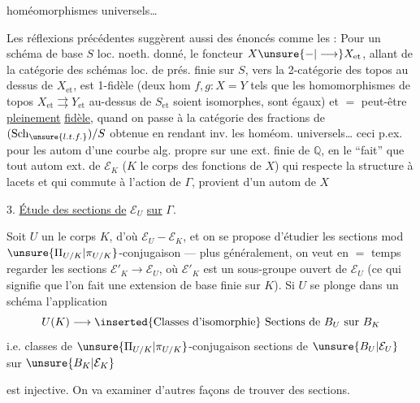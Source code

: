homéomorphismes universels\ldots

Les réflexions précédentes suggèrent aussi des énoncés comme les  : Pour un schéma de base $S$ loc. noeth. donné,
le foncteur $X\unsure{-|\longrightarrow}X_{\mathrm{et}}$, allant de la catégorie des schémas loc. de prés. finie  sur $S$, vers la 2-catégorie des topos au dessus de $X_{\mathrm{et}}$, est  1-fidèle (deux hom $f,g:X=Y$ tels que les homomorphismes de topos  $X_{\mathrm{et}}\rightrightarrows Y_{\mathrm{et}}$ au-dessus de $S_{\mathrm{et}}$ soient  isomorphes, sont égaux) et $=$ peut-être \uline{pleinement} \uline{fidèle}, quand on passe à la catégorie des fractions de $(\mathrm{Sch}_{\unsure{l.t.f.}})/S$ obtenue en rendant inv. les homéom. universels\ldots {}  ceci p.ex. pour les autom d'une courbe alg. propre sur une ext. finie de $\mathbb{Q}$, en  le ``fait'' que tout autom ext. de $\mathcal E_K$ ($K$ le corps des fonctions de $X$) qui respecte la structure à lacets et qui commute à l'action de $\Gamma$, provient d'un autom de $X$

3. \uline{Étude des sections de} $\mathcal{E}_U$ \uline{sur} $\Gamma$.

Soit $U$ un   le corps $K$, d'où $\mathcal{E}_U-\mathcal{E}_K$, et on se propose d'étudier les sections mod $\unsure{\Pi_{U/K}|\pi_{U/K}}$-conjugaison --- plus généralement, on veut en $=$ temps regarder les sections $\mathcal{E}'_K\longrightarrow\mathcal{E}_U$, où $\mathcal{E}'_K$ est un sous-groupe ouvert de $\mathcal{E}_U$ (ce qui signifie que l'on fait une extension de base finie sur $K$). Si  $U$ se plonge dans un schéma   l'application
\[
U(K)\longrightarrow \inserted{\text{Classes d'isomorphie}}\ \text{Sections de }B_U\text{ sur }B_K
\]
i.e. classes de $\unsure{\Pi_{U/K}|\pi_{U/K}}$-conjugaison  sections de $\unsure{B_U|\mathcal{E}_U}$ sur $\unsure{B_K|\mathcal{E}_K}$

est injective. On va examiner d'autres façons  de trouver des sections.

